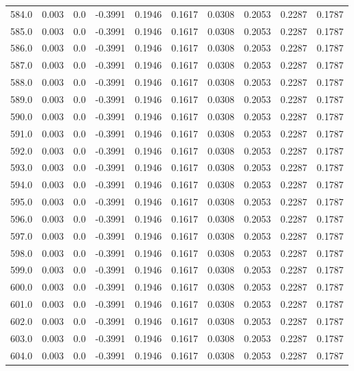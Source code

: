 \begin{longtable}{lrrrrrrrrr}
584.0 & 0.003 & 0.0 & -0.3991 & 0.1946 & 0.1617 & 0.0308 & 0.2053 & 0.2287 & 0.1787 \\
585.0 & 0.003 & 0.0 & -0.3991 & 0.1946 & 0.1617 & 0.0308 & 0.2053 & 0.2287 & 0.1787 \\
586.0 & 0.003 & 0.0 & -0.3991 & 0.1946 & 0.1617 & 0.0308 & 0.2053 & 0.2287 & 0.1787 \\
587.0 & 0.003 & 0.0 & -0.3991 & 0.1946 & 0.1617 & 0.0308 & 0.2053 & 0.2287 & 0.1787 \\
588.0 & 0.003 & 0.0 & -0.3991 & 0.1946 & 0.1617 & 0.0308 & 0.2053 & 0.2287 & 0.1787 \\
589.0 & 0.003 & 0.0 & -0.3991 & 0.1946 & 0.1617 & 0.0308 & 0.2053 & 0.2287 & 0.1787 \\
590.0 & 0.003 & 0.0 & -0.3991 & 0.1946 & 0.1617 & 0.0308 & 0.2053 & 0.2287 & 0.1787 \\
591.0 & 0.003 & 0.0 & -0.3991 & 0.1946 & 0.1617 & 0.0308 & 0.2053 & 0.2287 & 0.1787 \\
592.0 & 0.003 & 0.0 & -0.3991 & 0.1946 & 0.1617 & 0.0308 & 0.2053 & 0.2287 & 0.1787 \\
593.0 & 0.003 & 0.0 & -0.3991 & 0.1946 & 0.1617 & 0.0308 & 0.2053 & 0.2287 & 0.1787 \\
594.0 & 0.003 & 0.0 & -0.3991 & 0.1946 & 0.1617 & 0.0308 & 0.2053 & 0.2287 & 0.1787 \\
595.0 & 0.003 & 0.0 & -0.3991 & 0.1946 & 0.1617 & 0.0308 & 0.2053 & 0.2287 & 0.1787 \\
596.0 & 0.003 & 0.0 & -0.3991 & 0.1946 & 0.1617 & 0.0308 & 0.2053 & 0.2287 & 0.1787 \\
597.0 & 0.003 & 0.0 & -0.3991 & 0.1946 & 0.1617 & 0.0308 & 0.2053 & 0.2287 & 0.1787 \\
598.0 & 0.003 & 0.0 & -0.3991 & 0.1946 & 0.1617 & 0.0308 & 0.2053 & 0.2287 & 0.1787 \\
599.0 & 0.003 & 0.0 & -0.3991 & 0.1946 & 0.1617 & 0.0308 & 0.2053 & 0.2287 & 0.1787 \\
600.0 & 0.003 & 0.0 & -0.3991 & 0.1946 & 0.1617 & 0.0308 & 0.2053 & 0.2287 & 0.1787 \\
601.0 & 0.003 & 0.0 & -0.3991 & 0.1946 & 0.1617 & 0.0308 & 0.2053 & 0.2287 & 0.1787 \\
602.0 & 0.003 & 0.0 & -0.3991 & 0.1946 & 0.1617 & 0.0308 & 0.2053 & 0.2287 & 0.1787 \\
603.0 & 0.003 & 0.0 & -0.3991 & 0.1946 & 0.1617 & 0.0308 & 0.2053 & 0.2287 & 0.1787 \\
604.0 & 0.003 & 0.0 & -0.3991 & 0.1946 & 0.1617 & 0.0308 & 0.2053 & 0.2287 & 0.1787 \\

\end{longtable}
